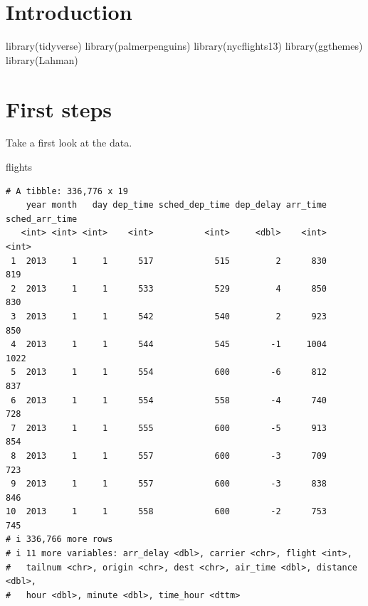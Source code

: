 \documentclass[
  letterpaper,
  DIV=11,
  numbers=noendperiod]{scrreprt}
\newenvironment{Shaded}{\begin{snugshade}}{\end{snugshade}}
\newcommand{\FunctionTok}[1]{\textcolor[rgb]{0.28,0.35,0.67}{#1}}
\newcommand{\NormalTok}[1]{\textcolor[rgb]{0.00,0.23,0.31}{#1}}
\begin{document}
\section{Introduction}\label{introduction}

\begin{Shaded}
\begin{Highlighting}[]
\FunctionTok{library}\NormalTok{(tidyverse)}
\FunctionTok{library}\NormalTok{(palmerpenguins)}
\FunctionTok{library}\NormalTok{(nycflights13)}
\FunctionTok{library}\NormalTok{(ggthemes)}
\FunctionTok{library}\NormalTok{(Lahman)}
\end{Highlighting}
\end{Shaded}

\section{First steps}\label{first-steps}

Take a first look at the data.

\begin{Shaded}
\begin{Highlighting}[]
\NormalTok{flights}
\end{Highlighting}
\end{Shaded}

\begin{verbatim}
# A tibble: 336,776 x 19
    year month   day dep_time sched_dep_time dep_delay arr_time sched_arr_time
   <int> <int> <int>    <int>          <int>     <dbl>    <int>          <int>
 1  2013     1     1      517            515         2      830            819
 2  2013     1     1      533            529         4      850            830
 3  2013     1     1      542            540         2      923            850
 4  2013     1     1      544            545        -1     1004           1022
 5  2013     1     1      554            600        -6      812            837
 6  2013     1     1      554            558        -4      740            728
 7  2013     1     1      555            600        -5      913            854
 8  2013     1     1      557            600        -3      709            723
 9  2013     1     1      557            600        -3      838            846
10  2013     1     1      558            600        -2      753            745
# i 336,766 more rows
# i 11 more variables: arr_delay <dbl>, carrier <chr>, flight <int>,
#   tailnum <chr>, origin <chr>, dest <chr>, air_time <dbl>, distance <dbl>,
#   hour <dbl>, minute <dbl>, time_hour <dttm>
\end{verbatim}
\end{document}
